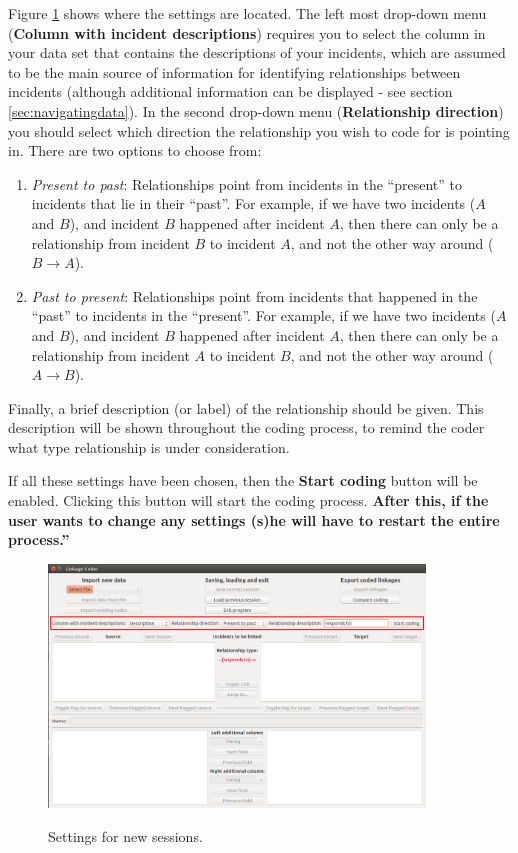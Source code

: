 \documentclass{memoir}
\begin{document}
Figure \ref{fig:settings} shows where the settings are located. The left most drop-down menu (\textbf{Column with incident descriptions}) requires you to select the column in your data set that contains the descriptions of your incidents, which are assumed to be the main source of information for identifying relationships between incidents (although additional information can be displayed - see section \ref{sec:navigatingdata}). In the second drop-down menu (\textbf{Relationship direction}) you should select which direction the relationship you wish to code for is pointing in. There are two options to choose from:
\begin{enumerate}
\item{\emph{Present to past}: Relationships point from incidents in the ``present'' to incidents that lie in their ``past''. For example, if we have two incidents (\(A\) and \(B\)), and incident \(B\) happened after incident \(A\), then there can only be a relationship from incident \(B\) to incident \(A\), and not the other way around (\(B\rightarrow A\)).}
\item{\emph{Past to present}: Relationships point from incidents that happened in the ``past'' to incidents in the ``present''}. For example, if we have two incidents (\(A\) and \(B\)), and incident \(B\) happened after incident \(A\), then there can only be a relationship from incident \(A\) to incident \(B\), and not the other way around (\(A\rightarrow B\)).
\end{enumerate}

Finally, a brief description (or label) of the relationship should be given. This description will be shown throughout the coding process, to remind the coder what type relationship is under consideration.

If all these settings have been chosen, then the \textbf{Start coding} button will be enabled. Clicking this button will start the coding process. \textbf{After this, if the user wants to change any settings (s)he will have to restart the entire process.''}

\begin{figure}[h!]
  \centering
  \caption{Settings for new sessions.}
  \includegraphics[width=100mm]{Screenshot_4.pdf}
  \label{fig:settings}
\end{figure}
\end{document}
